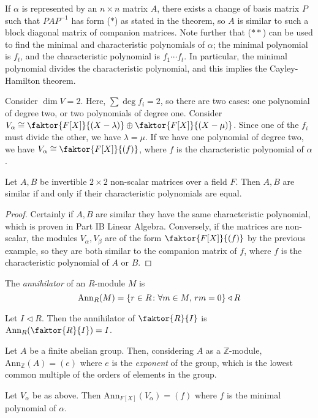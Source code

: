 \begin{remark}
	If \( \alpha \) is represented by an \( n \times n \) matrix \( A \), there exists a change of basis matrix \( P \) such that \( PAP^{-1} \) has form (\(\ast\)) as stated in the theorem, so \( A \) is similar to such a block diagonal matrix of companion matrices.
	Note further that (\(\ast\ast\)) can be used to find the minimal and characteristic polynomials of \( \alpha \); the minimal polynomial is \( f_t \), and the characteristic polynomial is \( f_1 \cdots f_t \).
	In particular, the minimal polynomial divides the characteristic polynomial, and this implies the Cayley-Hamilton theorem.
\end{remark}
\begin{example}
	Consider \( \dim V = 2 \).
	Here, \( \sum \deg f_i = 2 \), so there are two cases: one polynomial of degree two, or two polynomials of degree one.
	Consider \( V_\alpha \cong \faktor{F[X]}{(X-\lambda)} \oplus \faktor{F[X]}{(X-\mu)} \).
	Since one of the \( f_i \) must divide the other, we have \( \lambda = \mu \).
	If we have one polynomial of degree two, we have \( V_\alpha \cong \faktor{F[X]}{(f)} \), where \( f \) is the characteristic polynomial of \( \alpha \).
\end{example}
\begin{corollary}
	Let \( A, B \) be invertible \( 2 \times 2 \) non-scalar matrices over a field \( F \).
	Then \( A, B \) are similar if and only if their characteristic polynomials are equal.
\end{corollary}
\begin{proof}
	Certainly if \( A, B \) are similar they have the same characteristic polynomial, which is proven in Part IB Linear Algebra.
	Conversely, if the matrices are non-scalar, the modules \( V_\alpha, V_\beta \) are of the form \( \faktor{F[X]}{(f)} \) by the previous example, so they are both similar to the companion matrix of \( f \), where \( f \) is the characteristic polynomial of \( A \) or \( B \).
\end{proof}
\begin{definition}
	The \textit{annihilator} of an \( R \)-module \( M \) is
	\[
		\mathrm{Ann}_R(M) = \qty{r \in R \colon \forall m \in M,\, rm = 0} \triangleleft R
	\]
\end{definition}
\begin{example}
	Let \( I \triangleleft R \).
	Then the annihilator of \( \faktor{R}{I} \) is \( \mathrm{Ann}_R\qty(\faktor{R}{I}) = I \).

	Let \( A \) be a finite abelian group.
	Then, considering \( A \) as a \( \mathbb Z \)-module, \( \mathrm{Ann}_{\mathbb Z}(A) = (e) \) where \( e \) is the \textit{exponent} of the group, which is the lowest common multiple of the orders of elements in the group.

	Let \( V_\alpha \) be as above.
	Then \( \mathrm{Ann}_{F[X]}(V_\alpha) = (f) \) where \( f \) is the minimal polynomial of \( \alpha \).
\end{example}

